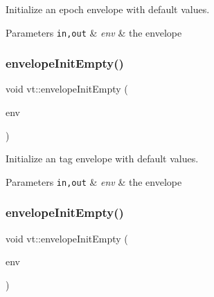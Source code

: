 Initialize an epoch envelope with default values. 


\begin{DoxyParams}[1]{Parameters}
\mbox{\tt in,out}  & {\em env} & the envelope \\
\hline
\end{DoxyParams}
\mbox{\label{namespacevt_a2c8d0d4109460ccb89316ca4b3cc3aea}} 
\subsubsection{\texorpdfstring{envelope\+Init\+Empty()}{envelopeInitEmpty()}\hspace{0.1cm}{\footnotesize\ttfamily [4/5]}}
{\footnotesize\ttfamily void vt\+::envelope\+Init\+Empty (\begin{DoxyParamCaption}\item[{\hyperlink{namespacevt_a7b951ab92dca9319e12e3fc406ccb309}{Tag\+Envelope} \&}]{env }\end{DoxyParamCaption})\hspace{0.3cm}{\ttfamily [inline]}}



Initialize an tag envelope with default values. 


\begin{DoxyParams}[1]{Parameters}
\mbox{\tt in,out}  & {\em env} & the envelope \\
\hline
\end{DoxyParams}
\mbox{\label{namespacevt_a358f72f3e1d5ce12cca7d622ee512302}} 
\subsubsection{\texorpdfstring{envelope\+Init\+Empty()}{envelopeInitEmpty()}\hspace{0.1cm}{\footnotesize\ttfamily [5/5]}}
{\footnotesize\ttfamily void vt\+::envelope\+Init\+Empty (\begin{DoxyParamCaption}\item[{\hyperlink{namespacevt_af23b58014ced6898422213a0e5e6a27a}{Epoch\+Tag\+Envelope} \&}]{env }\end{DoxyParamCaption})\hspace{0.3cm}{\ttfamily [inline]}}




